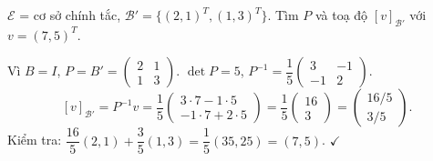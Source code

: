 \documentclass[12pt,a4paper]{article}
\begin{document}
\begin{vidu}
$\mathcal{E}$ = cơ sở chính tắc, $\mathcal{B}' = \{(2,1)^T, (1,3)^T\}$. Tìm $P$ và toạ độ $[v]_{\mathcal{B}'}$ với $v = (7,5)^T$.

Vì $B = I$, $P = B' = \begin{pmatrix}2 & 1\\1 & 3\end{pmatrix}$. $\det P = 5$, $P^{-1} = \dfrac{1}{5}\begin{pmatrix}3 & -1\\-1 & 2\end{pmatrix}$.
\[
  [v]_{\mathcal{B}'} = P^{-1} v = \dfrac{1}{5}\begin{pmatrix}3\cdot 7 - 1\cdot 5\\ -1\cdot 7 + 2\cdot 5\end{pmatrix} = \dfrac{1}{5}\begin{pmatrix}16\\ 3\end{pmatrix} = \begin{pmatrix}16/5\\ 3/5\end{pmatrix}.
\]
Kiểm tra: $\dfrac{16}{5}(2,1) + \dfrac{3}{5}(1,3) = \dfrac{1}{5}(35, 25) = (7, 5)$. $\checkmark$
\end{vidu}
\end{document}
